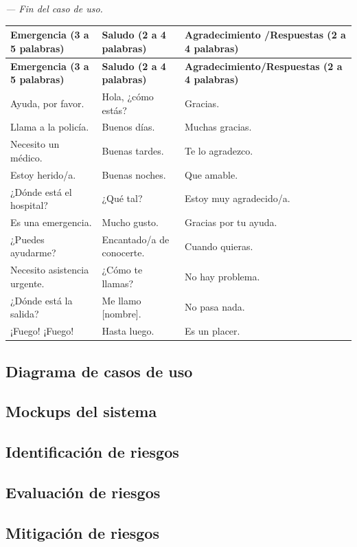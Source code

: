 \textit{--- Fin del caso de uso.}
\newpage
\begin{longtable}{|p{5cm}|p{5cm}|p{5cm}|}
    \hline
    \textbf{Emergencia (3 a 5 palabras)} & \textbf{Saludo (2 a 4 palabras)} & \textbf{Agradecimiento
    /Respuestas (2 a 4 palabras)} \\ \hline
    \endfirsthead
    \hline
    \textbf{Emergencia (3 a 5 palabras)} & \textbf{Saludo (2 a 4 palabras)} & \textbf{Agradecimiento/Respuestas (2 a 4 palabras)} \\ \hline
    \endhead
    \hline
    Ayuda, por favor. & Hola, ¿cómo estás? & Gracias. \\
    Llama a la policía. & Buenos días. & Muchas gracias. \\
    Necesito un médico. & Buenas tardes. & Te lo agradezco. \\
    Estoy herido/a. & Buenas noches. & Que amable. \\
    ¿Dónde está el hospital? & ¿Qué tal? & Estoy muy agradecido/a. \\
    Es una emergencia. & Mucho gusto. & Gracias por tu ayuda. \\
    ¿Puedes ayudarme? & Encantado/a de conocerte. & Cuando quieras. \\
    Necesito asistencia urgente. & ¿Cómo te llamas? & No hay problema. \\
    ¿Dónde está la salida? & Me llamo [nombre]. & No pasa nada. \\
    ¡Fuego! ¡Fuego! & Hasta luego. & Es un placer. \\
    \hline
    \end{longtable}


\subsection{Diagrama de casos de uso}
\subsection{Mockups del sistema}
\subsection{Identificación de riesgos}
\subsection{Evaluación de riesgos}
\subsection{Mitigación de riesgos}

